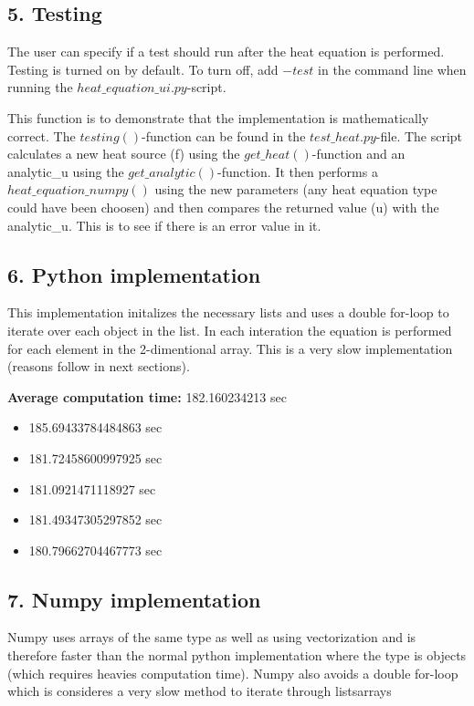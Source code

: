 \documentclass[a4paper]{article}
\begin{document}
\subsection*{5. Testing}

\begin{flushleft}                           
The user can specify if a test should run after the heat equation is performed. Testing is turned on by default. To turn off, add $-test$ in the command line when running the $heat\_equation\_ui.py$-script. \newline 

This function is to demonstrate that the implementation is mathematically correct. The $testing()$-function can be found in the $test\_heat.py$-file. The script calculates a new heat source (f) using the $get\_heat()$-function and an analytic\_u using the $get\_analytic()$-function. It then performs a $heat\_equation\_numpy()$ using the new parameters (any heat equation type could have been choosen) and then compares the returned value (u) with the analytic\_u. This is to see if there is an error value in it.
\end{flushleft}                        

\subsection*{6. Python implementation}
\begin{flushleft}                           
This implementation initalizes the necessary lists and uses a double for-loop to iterate over each object in the list. In each interation the equation is performed for each element in the 2-dimentional array. This is a very slow implementation (reasons follow in next sections).
\end{flushleft}                           

\textbf{Average computation time: }182.160234213 sec
\begin{itemize}  
\item 185.69433784484863 sec
\item 181.72458600997925 sec
\item 181.0921471118927 sec
\item 181.49347305297852 sec
\item 180.79662704467773 sec
\end{itemize}

\subsection*{7. Numpy implementation}
\begin{flushleft}                           
Numpy uses arrays of the same type as well as using vectorization and is therefore faster than the normal python implementation where the type is objects (which requires heavies computation time). Numpy also avoids a double for-loop which is consideres a very slow method to iterate through lists\/arrays 
\end{flushleft}                           
\end{document}
